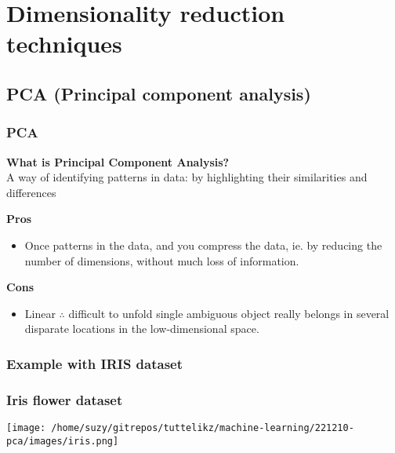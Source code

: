 \documentclass{beamer}
\begin{document}
    \section{Dimensionality reduction techniques}
    \subsection{PCA (Principal component analysis)}
    \begin{frame}
        \frametitle{PCA}
        
        \textbf{What is Principal Component Analysis?} \\
        A way of identifying patterns in data: by highlighting their similarities and differences
        
        \bigskip
        \textbf{Pros}
        \begin{itemize}
            \item Once patterns in the data, and you compress the data, ie. by reducing the number of dimensions, without much loss of information.
        \end{itemize}

        \textbf{Cons}
        \begin{itemize}
            \item Linear $\therefore$ difficult to unfold single ambiguous object really belongs in several disparate locations in the low-dimensional space.
        \end{itemize}
    \end{frame}


    \subsubsection{Example with IRIS dataset}
    \begin{frame}
        \frametitle{Iris flower dataset}
        \begin{center}
        \texttt{[image: /home/suzy/gitrepos/tuttelikz/machine-learning/221210-pca/images/iris.png]}
        \end{center}
    \end{frame}
    
\end{document}

